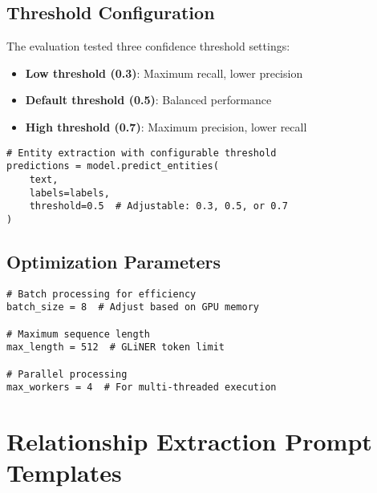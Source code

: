 \subsection{Threshold Configuration}
The evaluation tested three confidence threshold settings:
\begin{itemize}
    \item \textbf{Low threshold (0.3)}: Maximum recall, lower precision
    \item \textbf{Default threshold (0.5)}: Balanced performance
    \item \textbf{High threshold (0.7)}: Maximum precision, lower recall
\end{itemize}

\begin{verbatim}
# Entity extraction with configurable threshold
predictions = model.predict_entities(
    text,
    labels=labels,
    threshold=0.5  # Adjustable: 0.3, 0.5, or 0.7
)
\end{verbatim}

\subsection{Optimization Parameters}
\begin{verbatim}
# Batch processing for efficiency
batch_size = 8  # Adjust based on GPU memory

# Maximum sequence length
max_length = 512  # GLiNER token limit

# Parallel processing
max_workers = 4  # For multi-threaded execution
\end{verbatim}

\section{Relationship Extraction Prompt Templates}


